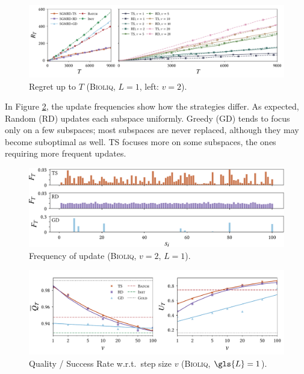 \begin{figure}
	\includegraphics[width=\linewidth]{part4-figures/pyro_pseudoregret_step2_S_b_2-compressed.pdf}
	\caption{Regret up to $T$ (\textsc{Bioliq}, ${L}=1$, left: $v = 2$).} 
	\label{fig:SGMRD_SubspaceMonitoring_Pseudoregret}
\end{figure}

In Figure \ref{fig:SGMRD_UpdateFrequency}, the update frequencies show how the strategies differ. 
As expected, Random (RD) updates each subspace uniformly. Greedy (GD) tends to focus only on a few subspaces; most subspaces are never replaced, although they may become suboptimal as well. \acrshort{TS} focuses more on some subspaces, the ones requiring more frequent updates.

\begin{figure}
	\includegraphics[width=\linewidth]{part4-figures/bioliq1_SGMRD_freq-crop-compressed.pdf}
	\caption{Frequency of update (\textsc{Bioliq}, $v = 2$, $L=1$).} 
	\label{fig:SGMRD_UpdateFrequency}
\end{figure} 

\begin{figure}
	\includegraphics[width=\linewidth]{part4-figures/pyro_quality_success_step_3_S_b_2-compressed.pdf}
	\caption{Quality / Success Rate w.r.t.\ step size $v$ (\textsc{Bioliq}, $\gls{L}=1$).}
	\label{fig:SGMRD_QualityUpdateWRTstep}
\end{figure} 

